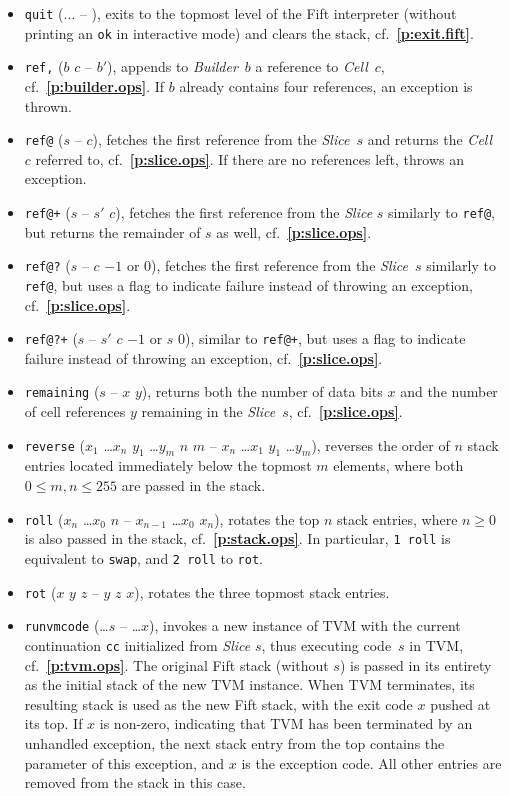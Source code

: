 \documentclass[12pt,oneside]{article}
\def\refpoint#1{{\rm\textbf{\ref{#1}}}}
\let\ptref=\refpoint
\begin{document}
\begin{itemize}
\item {\tt quit} ($\dots$ -- ), exits to the topmost level of the Fift interpreter (without printing an {\tt ok} in interactive mode) and clears the stack, cf.~\ptref{p:exit.fift}.
\item {\tt ref,} ($b$ $c$ -- $b'$), appends to {\em Builder\/}~$b$ a reference to {\em Cell\/}~$c$, cf.~\ptref{p:builder.ops}. If $b$ already contains four references, an exception is thrown.
\item {\tt ref@} ($s$ -- $c$), fetches the first reference from the {\em Slice\/}~$s$ and returns the {\em Cell}~$c$ referred to, cf.~\ptref{p:slice.ops}. If there are no references left, throws an exception.
\item {\tt ref@+} ($s$ -- $s'$ $c$), fetches the first reference from the {\em Slice\/} $s$ similarly to {\tt ref@}, but returns the remainder of $s$ as well, cf.~\ptref{p:slice.ops}.
\item {\tt ref@?} ($s$ -- $c$ $-1$ or $0$), fetches the first reference from the {\em Slice}~$s$ similarly to {\tt ref@}, but uses a flag to indicate failure instead of throwing an exception, cf.~\ptref{p:slice.ops}.
\item {\tt ref@?+} ($s$ -- $s'$ $c$ $-1$ or $s$ $0$), similar to {\tt ref@+}, but uses a flag to indicate failure instead of throwing an exception, cf.~\ptref{p:slice.ops}.
\item {\tt remaining} ($s$ -- $x$ $y$), returns both the number of data bits $x$ and the number of cell references $y$ remaining in the {\em Slice}~$s$, cf.~\ptref{p:slice.ops}.
\item {\tt reverse} ($x_1$ \dots $x_n$ $y_1$ \dots $y_m$ $n$ $m$ -- $x_n$ \dots $x_1$ $y_1$ \dots $y_m$), reverses the order of $n$ stack entries located immediately below the topmost $m$ elements, where both $0\leq m,n\leq 255$ are passed in the stack.
\item {\tt roll} ($x_n$ \dots $x_0$ $n$ -- $x_{n-1}$ \dots $x_0$ $x_n$), rotates the top $n$ stack entries, where $n\geq0$ is also passed in the stack, cf.~\ptref{p:stack.ops}. In particular, {\tt 1 roll} is equivalent to {\tt swap}, and {\tt 2 roll} to {\tt rot}.
\item {\tt rot} ($x$ $y$ $z$ -- $y$ $z$ $x$), rotates the three topmost stack entries.
\item {\tt runvmcode} (\dots $s$ -- \dots $x$), invokes a new instance of TVM with the current continuation {\tt cc} initialized from {\em Slice\/} $s$, thus executing code~$s$ in TVM, cf.~\ptref{p:tvm.ops}. The original Fift stack (without $s$) is passed in its entirety as the initial stack of the new TVM instance. When TVM terminates, its resulting stack is used as the new Fift stack, with the exit code $x$ pushed at its top. If $x$ is non-zero, indicating that TVM has been terminated by an unhandled exception, the next stack entry from the top contains the parameter of this exception, and $x$ is the exception code. All other entries are removed from the stack in this case.

\end{itemize}
\end{document}
